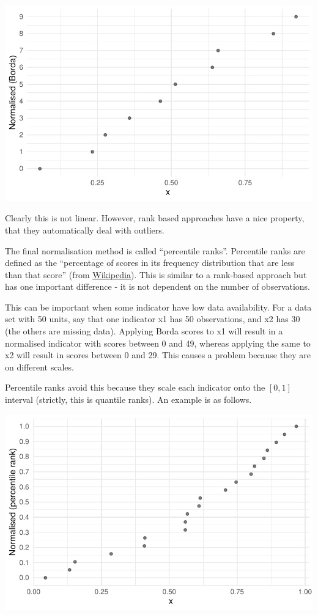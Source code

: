 \documentclass[
  letterpaper,
  DIV=11,
  numbers=noendperiod]{scrreprt}
\begin{document}
\includegraphics{normalisation_files/figure-pdf/unnamed-chunk-3-1.pdf}

Clearly this is not linear. However, rank based approaches have a nice
property, that they automatically deal with outliers.

The final normalisation method is called ``percentile ranks''.
Percentile ranks are defined as the ``percentage of scores in its
frequency distribution that are less than that score'' (from
\href{https://en.wikipedia.org/wiki/Percentile_rank}{Wikipedia}). This
is similar to a rank-based approach but has one important difference -
it is not dependent on the number of observations.

This can be important when some indicator have low data availability.
For a data set with 50 units, say that one indicator x1 has 50
observations, and x2 has 30 (the others are missing data). Applying
Borda scores to x1 will result in a normalised indicator with scores
between 0 and 49, whereas applying the same to x2 will result in scores
between 0 and 29. This causes a problem because they are on different
scales.

Percentile ranks avoid this because they scale each indicator onto the
\([0,1]\) interval (strictly, this is quantile ranks). An example is as
follows.

\includegraphics{normalisation_files/figure-pdf/unnamed-chunk-4-1.pdf}
\end{document}
